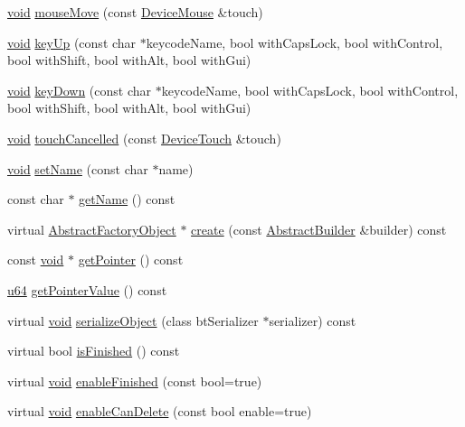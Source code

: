 \begin{DoxyCompactItemize}
\mbox{\hyperlink{_thread_8h_af1e856da2e658414cb2456cb6f7ebc66}{void}} \mbox{\hyperlink{classnjli_1_1_world_state_a98672e3be284b2d67ec16f6584b2b397}{mouse\+Move}} (const \mbox{\hyperlink{classnjli_1_1_device_mouse}{Device\+Mouse}} \&touch)
\item 
\mbox{\hyperlink{_thread_8h_af1e856da2e658414cb2456cb6f7ebc66}{void}} \mbox{\hyperlink{classnjli_1_1_world_state_aae2e57b0dc2729fea3a20359deea8279}{key\+Up}} (const char $\ast$keycode\+Name, bool with\+Caps\+Lock, bool with\+Control, bool with\+Shift, bool with\+Alt, bool with\+Gui)
\item 
\mbox{\hyperlink{_thread_8h_af1e856da2e658414cb2456cb6f7ebc66}{void}} \mbox{\hyperlink{classnjli_1_1_world_state_a92e70a36e927a44a8eefc6039505ed24}{key\+Down}} (const char $\ast$keycode\+Name, bool with\+Caps\+Lock, bool with\+Control, bool with\+Shift, bool with\+Alt, bool with\+Gui)
\item 
\mbox{\hyperlink{_thread_8h_af1e856da2e658414cb2456cb6f7ebc66}{void}} \mbox{\hyperlink{classnjli_1_1_world_state_a2c8b22b216dc3652fe8f5185365a6a20}{touch\+Cancelled}} (const \mbox{\hyperlink{classnjli_1_1_device_touch}{Device\+Touch}} \&touch)
\item 
\mbox{\hyperlink{_thread_8h_af1e856da2e658414cb2456cb6f7ebc66}{void}} \mbox{\hyperlink{classnjli_1_1_world_state_a087eb5f8d9f51cc476f12f1d10a3cb95}{set\+Name}} (const char $\ast$name)
\item 
const char $\ast$ \mbox{\hyperlink{classnjli_1_1_world_state_ad41266885be835f3ee602311e20877a4}{get\+Name}} () const
\item 
virtual \mbox{\hyperlink{classnjli_1_1_abstract_factory_object}{Abstract\+Factory\+Object}} $\ast$ \mbox{\hyperlink{classnjli_1_1_world_state_a83a8876ae63b92804004cf3febe76573}{create}} (const \mbox{\hyperlink{classnjli_1_1_abstract_builder}{Abstract\+Builder}} \&builder) const
\item 
const \mbox{\hyperlink{_thread_8h_af1e856da2e658414cb2456cb6f7ebc66}{void}} $\ast$ \mbox{\hyperlink{classnjli_1_1_world_state_ac4ca71716ed832be357f15f8262c8448}{get\+Pointer}} () const
\item 
\mbox{\hyperlink{_util_8h_ad758b7a5c3f18ed79d2fcd23d9f16357}{u64}} \mbox{\hyperlink{classnjli_1_1_world_state_a4ffddf141a426a5a07d0ac19f1913811}{get\+Pointer\+Value}} () const
\item 
virtual \mbox{\hyperlink{_thread_8h_af1e856da2e658414cb2456cb6f7ebc66}{void}} \mbox{\hyperlink{classnjli_1_1_world_state_a4fc4bcd9d1930911474210c047372fc0}{serialize\+Object}} (class bt\+Serializer $\ast$serializer) const
\item 
virtual bool \mbox{\hyperlink{classnjli_1_1_world_state_a4c7007210237496fbe169ba114c3750d}{is\+Finished}} () const
\item 
virtual \mbox{\hyperlink{_thread_8h_af1e856da2e658414cb2456cb6f7ebc66}{void}} \mbox{\hyperlink{classnjli_1_1_world_state_aa4e66d0016cd5c43dc3a485eaf558174}{enable\+Finished}} (const bool=true)
\item 
virtual \mbox{\hyperlink{_thread_8h_af1e856da2e658414cb2456cb6f7ebc66}{void}} \mbox{\hyperlink{classnjli_1_1_world_state_a4ed007508bd8f80af668a302376b7d1a}{enable\+Can\+Delete}} (const bool enable=true)
\end{DoxyCompactItemize}
